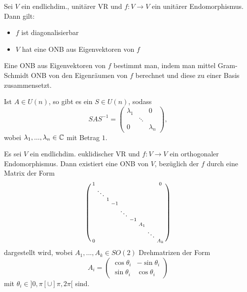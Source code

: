 \documentclass{cheat-sheet}
\begin{document}
\begin{satz}
Sei $V$ ein endlichdim., unitärer VR und $f : V \to V$ ein unitärer Endomorphismus. Dann gilt:
\begin{itemize}
  \item $f$ ist diagonalisierbar
  \item $V$ hat eine ONB aus Eigenvektoren von $f$
\end{itemize}
\end{satz}

\begin{verf}
Eine ONB aus Eigenvektoren von $f$ bestimmt man, indem man mittel Gram-Schmidt ONB von den Eigenräumen von $f$ berechnet und diese zu einer Basis zusammensetzt.
\end{verf}

\begin{kor}
Ist $A \in U(n)$, so gibt es ein $S \in U(n)$, sodass
\[ SAS^{-1} = \begin{pmatrix} \lambda_1 & & 0 \\ & \ddots & \\ 0 & & \lambda_n \end{pmatrix}, \]
wobei $\lambda_1, ..., \lambda_n \in \mathbb{C}$ mit Betrag $1$.
\end{kor}

\begin{satz}
Es sei $V$ ein endlichdim. euklidischer VR und $f : V \to V$ ein orthogonaler Endomorphismus. Dann existiert eine ONB von $V$, bezüglich der $f$ durch eine Matrix der Form
\[ \begin{psmallmatrix}
1 & & & & & & & & 0 \\
& \ddots && \\
&& 1 \\
&&& -1 \\
&&&& \ddots \\
&&&&& -1 \\
&&&&&& A_1 \\
&&&&&&& \ddots \\
0 &&&&&&&& A_k  \\
\end{psmallmatrix} \]
dargestellt wird, wobei $A_1, ..., A_k \in SO(2)$ Drehmatrizen der Form
\[ A_i = \begin{pmatrix}
\cos \theta_i & - \sin \theta_i \\
\sin \theta_i & \cos \theta_i
\end{pmatrix} \]
mit $\theta_i \in ]0, \pi[ \cup ]\pi, 2 \pi[$ sind.
\end{satz}
\end{document}
